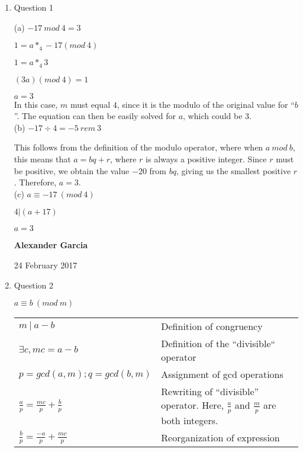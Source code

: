 \documentclass[11pt]{article}
\begin{document}
\begin{enumerate}

	\item Question 1

		(a) $-17\ mod\ 4 = 3$

		$1 = a *_4 -17 (mod\ 4)$

		$1 = a * _4 3$

		$(3a)(mod\ 4) = 1$

		$a = 3$\\

		In this case, $m$ must equal $4$, since it is the modulo of the original value for
		``$b$''. The equation can then be easily solved for $a$, which could be 3. \\

		(b) $-17 \div 4 = -5\ rem\ 3$

		This follows from the definition of the modulo operator, where when $a\ mod\ b$,
		this means that $a = bq + r$, where $r$ is always a positive integer. Since $r$ must
		be positive, we obtain the value $-20$ from $bq$, giving us the smallest positive $r$.
		Therefore, $a = 3$. \\

		(c) $a \equiv -17\ (mod\ 4)$

		$4 | (a+17)$

		$a = 3$ \\
		\newpage
		

	\textbf{Alexander Garcia}	

	24 February 2017

	\item Question 2
		
		$a \equiv b\ (mod\ m)$ 

		\begin{tabular}{ll}
			$m\ |\ a-b$ & Definition of congruency \\

			$\exists c, mc = a-b$ & Definition of the ``divisible`` operator \\ 

			$p = gcd(a,m); q = gcd(b,m)$ & Assignment of gcd operations \\

			$\frac{a}{p} = \frac{mc}{p} + \frac{b}{p}$ & Rewriting of ``divisible''
			operator. Here, $\frac{a}{p}$ and $\frac{m}{p}$ are both integers. \\

			$\frac{b}{p} = \frac{-a}{p} + \frac{mc}{p}$ & Reorganization of expression \\


\end{tabular}
\end{enumerate}
\end{document}
